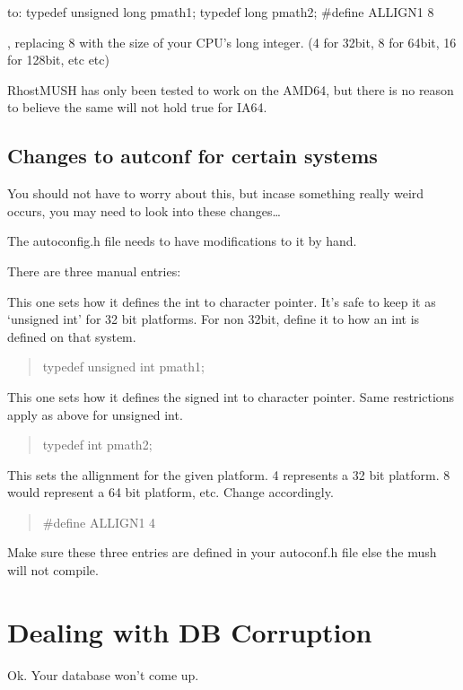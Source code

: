 \documentclass[letterpaper,10pt,english]{sphinxmanual}
\begin{document}
\sphinxAtStartPar
to:
typedef unsigned long   pmath1;
typedef long            pmath2;
\#define ALLIGN1 8

\sphinxAtStartPar
, replacing 8 with the size of your CPU’s long integer. (4 for 32\sphinxhyphen{}bit,
8 for 64\sphinxhyphen{}bit, 16 for 128\sphinxhyphen{}bit, etc etc)

\sphinxAtStartPar
RhostMUSH has only been tested to work on the AMD64, but there is no
reason to believe the same will not hold true for IA64.


\section{Changes to autconf for certain systems}
\label{\detokenize{26-compileerror:changes-to-autconf-for-certain-systems}}
\sphinxAtStartPar
You should not have to worry about this, but incase something really
weird occurs, you may need to look into these changes…

\sphinxAtStartPar
The autoconfig.h file needs to have modifications to it by hand.

\sphinxAtStartPar
There are three manual entries:

\sphinxAtStartPar
This one sets how it defines the int to character pointer.  It’s safe
to keep it as ‘unsigned int’ for 32 bit platforms.  For non 32\sphinxhyphen{}bit,
define it to  how an int is defined on that system.
\begin{quote}

\sphinxAtStartPar
typedef unsigned int    pmath1;
\end{quote}

\sphinxAtStartPar
This one sets how it defines the signed int to character pointer.  Same
restrictions apply as above for unsigned int.
\begin{quote}

\sphinxAtStartPar
typedef int     pmath2;
\end{quote}

\sphinxAtStartPar
This sets the allignment for the given platform.  4 represents a 32 bit
platform.  8 would represent a 64 bit platform, etc.  Change accordingly.
\begin{quote}

\sphinxAtStartPar
\#define ALLIGN1 4
\end{quote}

\sphinxAtStartPar
Make sure these three entries are defined in your autoconf.h file else
the mush will not compile.


\chapter{Dealing with DB Corruption}
\label{\detokenize{27-dbcorrupt:dealing-with-db-corruption}}\label{\detokenize{27-dbcorrupt::doc}}
\sphinxAtStartPar
Ok.  Your database won’t come up.
\end{document}

